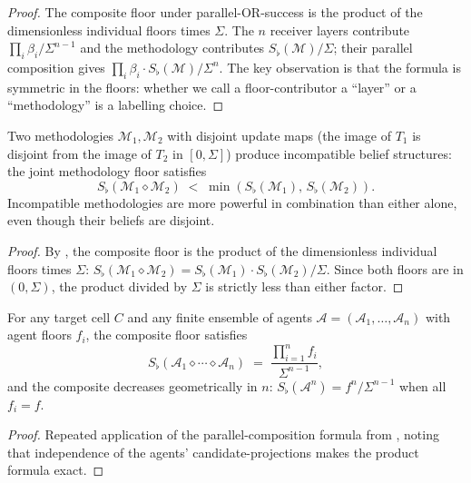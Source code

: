 \begin{proof}
The composite floor under parallel-OR-success is the product of the
dimensionless individual floors times $\Sigma$.  The $n$ receiver layers
contribute $\prod_i \beta_i / \Sigma^{n-1}$ and the methodology contributes
$S_\flat(\mathcal{M}) / \Sigma$; their parallel composition gives
$\prod_i \beta_i \cdot S_\flat(\mathcal{M}) / \Sigma^n$.  The key observation
is that the formula is symmetric in the floors: whether we call a
floor-contributor a ``layer'' or a ``methodology'' is a labelling choice.
\end{proof}

\begin{theorem}
\label{thm:meth-incompatibility}
Two methodologies $\mathcal{M}_1, \mathcal{M}_2$ with disjoint update maps
(the image of $T_1$ is disjoint from the image of $T_2$ in
$[0, \Sigma]$) produce incompatible belief structures: the joint
methodology floor satisfies
\[
  S_\flat(\mathcal{M}_1 \diamond \mathcal{M}_2)
  \;<\; \min(S_\flat(\mathcal{M}_1),\, S_\flat(\mathcal{M}_2)) .
\]
Incompatible methodologies are more powerful in combination than either
alone, even though their beliefs are disjoint.
\end{theorem}

\begin{proof}
By , the composite floor is the product of
the dimensionless individual floors times $\Sigma$:
$S_\flat(\mathcal{M}_1 \diamond \mathcal{M}_2) =
S_\flat(\mathcal{M}_1) \cdot S_\flat(\mathcal{M}_2) / \Sigma$.
Since both floors are in $(0, \Sigma)$, the product divided by $\Sigma$
is strictly less than either factor.
\end{proof}

\begin{theorem}
\label{thm:agent-floor-distribution}
For any target cell $C$ and any finite ensemble of agents
$\mathcal{A} = (\mathcal{A}_1, \ldots, \mathcal{A}_n)$ with agent floors
$f_i$, the composite floor satisfies
\[
  S_\flat(\mathcal{A}_1 \diamond \cdots \diamond \mathcal{A}_n)
  \;=\; \frac{\prod_{i=1}^n f_i}{\Sigma^{n-1}} ,
\]
and the composite decreases geometrically in $n$:
$S_\flat(\mathcal{A}^n) = f^n / \Sigma^{n-1}$ when all $f_i = f$.
\end{theorem}

\begin{proof}
Repeated application of the parallel-composition formula from
, noting that independence of the agents'
candidate-projections makes the product formula exact.
\end{proof}

